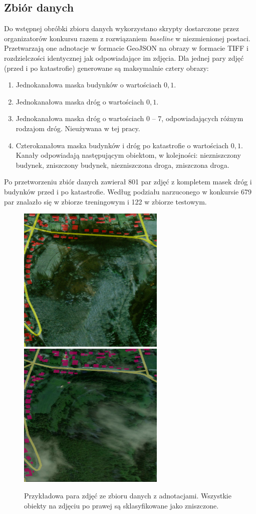 \subsection{Zbiór danych}
Do wstępnej obróbki zbioru danych wykorzystano skrypty dostarczone przez organizatorów konkursu razem z rozwiązaniem \textit{baseline} w niezmienionej postaci. Przetwarzają one adnotacje w formacie GeoJSON na obrazy w formacie TIFF i rozdzielczości identycznej jak odpowiadające im zdjęcia. Dla jednej pary zdjęć (przed i po katastrofie) generowane są maksymalnie cztery obrazy:
\begin{enumerate}
\item Jednokanałowa maska budynków o wartościach $0, 1$.
\item Jednokanałowa maska dróg o wartościach $0, 1$.
\item Jednokanałowa maska dróg o wartościach 0 -- 7, odpowiadających różnym rodzajom dróg. Nieużywana w tej pracy.
\item Czterokanałowa maska budynków i dróg po katastrofie o wartościach $0, 1$. Kanały odpowiadają następującym obiektom, w kolejności: niezniszczony budynek, zniszczony budynek, niezniszczona droga, zniszczona droga.
\end{enumerate}
Po przetworzeniu zbiór danych zawierał 801 par zdjęć z kompletem masek dróg i budynków przed i po katastrofie. Według podziału narzuconego w konkursie 679 par znalazło się w zbiorze treningowym i 122 w zbiorze testowym.\\
\begin{figure}[h]
\centering
\includegraphics[width=7cm,height=7cm]{rysunki/10500500C4DD7000_0_30_69_PRE.png}
\includegraphics[width=7cm,height=7cm]{rysunki/10500500C4DD7000_0_30_69_POST.png}
\caption[Wizualizacja danych]{Przykładowa para zdjęć ze zbioru danych z adnotacjami. Wszystkie obiekty na zdjęciu po prawej są sklasyfikowane jako zniszczone.}
\end{figure}
